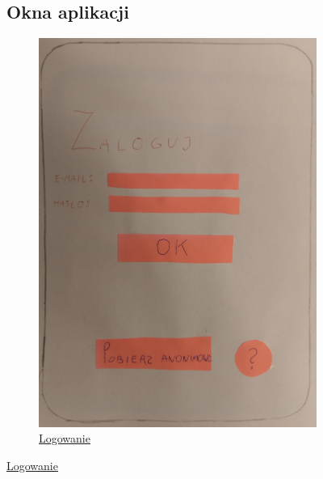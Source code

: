\documentclass[12pt]{article}
\begin{document}
\begin{figure}[h!]
\subsection{Okna aplikacji}
\centering
\begin{subfigure}[ba]{1\linewidth}
	\includegraphics[width=\linewidth]{zdj/1.jpg}
	\caption{\underline{Logowanie}}
\end{subfigure}
\end{figure}
\end{document}
